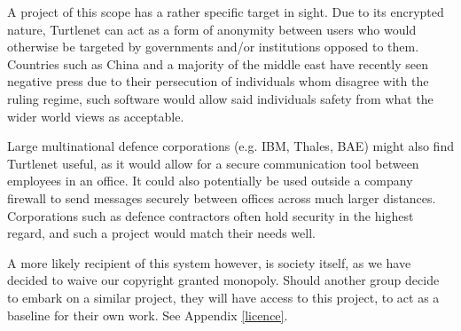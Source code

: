 A project of this scope has a rather specific target in sight. Due to its 
encrypted nature, Turtlenet can act as a form of anonymity between users who 
would otherwise be targeted by governments and/or institutions opposed to 
them. Countries such as China\cite{chinafirewall} and a majority of the middle 
east\cite{libyaEgypt} have recently seen negative press due to their 
persecution of individuals whom disagree with the ruling regime, such software 
would allow said individuals safety from what the wider world views as 
acceptable. 

Large multinational defence corporations (e.g. IBM, Thales, BAE) might also 
find Turtlenet useful, as it would allow for a secure communication tool 
between employees in an office. It could also potentially be used outside a 
company firewall to send messages securely between offices across much larger 
distances. Corporations such as defence contractors often hold security in the 
highest regard, and such a project would match their needs well.

A more likely recipient of this system however, is society itself, as we
have decided to waive our copyright granted monopoly. Should another group
decide to embark on a similar project, they will have access to this project,
to act as a baseline for their own work. See Appendix \ref{licence}.
